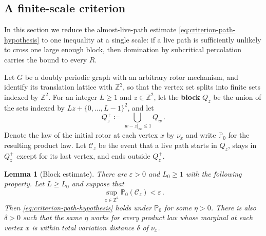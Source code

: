 \documentclass[11pt]{amsart}
\theoremstyle{plain}
\newtheorem{lemma}[theorem]{Lemma}
\theoremstyle{definition}
\newcommand{\Z}{\mathbb Z}
\renewcommand{\P}{\mathbb P}
\newcommand{\defn}[1]{\textbf{#1}}
\begin{document}
	
	\subsection{A finite-scale criterion}\label{sec:block}
	In this section we reduce the almost-live-path estimate \eqref{eq:criterion-path-hypothesis}
	to one inequality at a single scale: if a
	live path is sufficiently unlikely to cross one large enough block, then domination by
	subcritical percolation carries the bound to every $R$.
	
	Let $G$ be a doubly periodic graph with an arbitrary rotor mechanism, and identify its translation lattice with $\Z^2$, so that the vertex set splits into finite sets indexed by $\Z^2$.  For an integer
	$L\geq1$ and $z\in\Z^2$, let the \defn{block} $Q_z$ be the union of the sets
	indexed by $Lz+\{0,\ldots,L-1\}^2$, and let
	\begin{equation}\label{eq:block-definitions}
		Q_z^+\coloneqq\bigcup_{|w-z|_\infty\leq1}Q_w\, .
	\end{equation}
	Denote the law of the initial rotor at each vertex $x$ by $\nu_x$ and write $\P_0$ for the
	resulting product law.  Let $\mathcal C_z$ be the event that a live path
	starts in $Q_z$, stays in $Q_z^+$ except for its last vertex, and ends
	outside $Q_z^+$.
	
	\begin{lemma}[Block estimate]
		\label{lem:block-live-paths}
		There are $\varepsilon>0$ and $L_0\geq1$ with the following property.  Let
		$L\geq L_0$ and suppose that
		\begin{equation}\label{eq:block-crossing-hypothesis}
			\sup_{z\in\Z^2}\P_0(\mathcal C_z)<\varepsilon\, .
		\end{equation}
		Then \eqref{eq:criterion-path-hypothesis} holds under $\P_0$ for some
		$\eta>0$.  There is also $\delta>0$ such that the same $\eta$ works
		for every product law whose marginal at each vertex $x$ is within total
		variation distance $\delta$ of $\nu_x$.
	\end{lemma}
	
\end{document}
